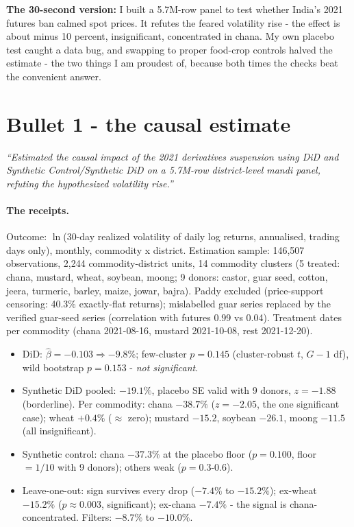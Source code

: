 \documentclass[11pt]{article}
\begin{document}
\noindent\textbf{The 30-second version:} I built a 5.7M-row panel to test whether India's
2021 futures ban calmed spot prices. It refutes the feared volatility rise - the effect is
about minus 10 percent, insignificant, concentrated in chana. My own placebo test caught a
data bug, and swapping to proper food-crop controls halved the estimate - the two things I
am proudest of, because both times the checks beat the convenient answer.

\section{Bullet 1 - the causal estimate}

\noindent\emph{``Estimated the causal impact of the 2021 derivatives suspension using
DiD and Synthetic Control/Synthetic DiD on a 5.7M-row district-level mandi panel,
refuting the hypothesized volatility rise.''}

\paragraph{The receipts.} Outcome: $\ln$(30-day realized volatility of daily log returns,
annualised, trading days only), monthly, commodity x district. Estimation sample:
146{,}507 observations, 2{,}244 commodity-district units, 14 commodity clusters
(5 treated: chana, mustard, wheat, soybean, moong; 9 donors: castor, guar seed, cotton,
jeera, turmeric, barley, maize, jowar, bajra). Paddy excluded (price-support censoring:
40.3\% exactly-flat returns); mislabelled guar series replaced by the verified guar-seed
series (correlation with futures 0.99 vs 0.04). Treatment dates per commodity (chana
2021-08-16, mustard 2021-10-08, rest 2021-12-20).
\begin{itemize}[leftmargin=1.6em,itemsep=1pt]
  \item DiD: $\hat\beta=-0.103 \Rightarrow -9.8\%$; few-cluster $p=0.145$ (cluster-robust
        $t$, $G{-}1$ df), wild bootstrap $p=0.153$ - \emph{not significant}.
  \item Synthetic DiD pooled: $-19.1\%$, placebo SE valid with 9 donors, $z=-1.88$
        (borderline). Per commodity: chana $-38.7\%$ ($z=-2.05$, the one significant
        case); wheat $+0.4\%$ ($\approx$ zero); mustard $-15.2$, soybean $-26.1$, moong
        $-11.5$ (all insignificant).
  \item Synthetic control: chana $-37.3\%$ at the placebo floor ($p=0.100$, floor $=1/10$
        with 9 donors); others weak ($p=0.3$-$0.6$).
  \item Leave-one-out: sign survives every drop ($-7.4\%$ to $-15.2\%$); ex-wheat
        $-15.2\%$ ($p\approx0.003$, significant); ex-chana $-7.4\%$ - the signal is
        chana-concentrated. Filters: $-8.7\%$ to $-10.0\%$.
\end{itemize}
\end{document}
